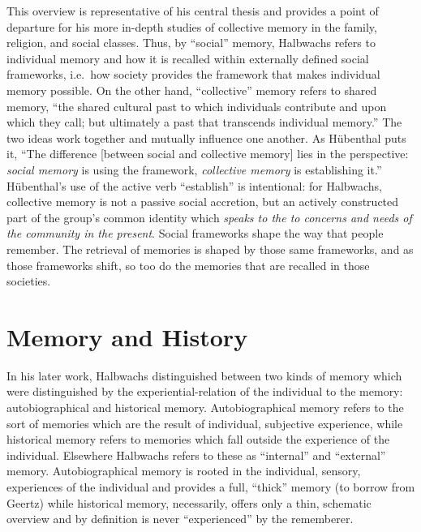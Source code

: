 This overview is representative of his central thesis and provides a
point of departure for his more in-depth studies of collective memory in
the family, religion, and social classes. Thus, by ``social'' memory,
Halbwachs refers to individual memory and how it is recalled within
externally defined social frameworks, i.e.~how society provides the
framework that makes individual memory
possible.\autocite[180]{hubenthal_carstens-hasselbalch2012} On the other
hand, ``collective'' memory refers to shared memory, ``the shared
cultural past to which individuals contribute and upon which they call;
but ultimately a past that transcends individual
memory.''\autocites[360]{keith_ec2015}[See
also][180]{hubenthal_carstens-hasselbalch2012} The two ideas work
together and mutually influence one another. As Hübenthal puts it, ``The
difference {[}between social and collective memory{]} lies in the
perspective: \emph{social memory} is using the framework,
\emph{collective memory} is establishing
it.''\autocite[180.]{hubenthal_carstens-hasselbalch2012} Hübenthal's use
of the active verb ``establish'' is intentional: for Halbwachs,
collective memory is not a passive social accretion, but an actively
constructed part of the group's common identity which \emph{speaks to
the to concerns and needs of the community in the present}. Social
frameworks shape the way that people remember. The retrieval of memories
is shaped by those same frameworks, and as those frameworks shift, so
too do the memories that are recalled in those societies.\autocites[For
a modern assessments on the malleability of human memory and the effects
of social networks on the formation of collective memory,
see][]{coman-etal_pnas2016}{yamashiro-hirst_jarmc2014}{coman-etal_yang-etal2012}

\hypertarget{memory-and-history}{%
\section{Memory and History}\label{memory-and-history}}

In his later work, Halbwachs distinguished between two kinds of memory
which were distinguished by the experiential-relation of the individual
to the memory: autobiographical and historical
memory.\autocite[52]{halbwachs1980} Autobiographical memory refers to
the sort of memories which are the result of individual, subjective
experience, while historical memory refers to memories which fall
outside the experience of the individual. Elsewhere Halbwachs refers to
these as ``internal'' and ``external'' memory. Autobiographical memory
is rooted in the individual, sensory, experiences of the individual and
provides a full, ``thick'' memory (to borrow from Geertz) while
historical memory, necessarily, offers only a thin, schematic overview
and by definition is never ``experienced'' by the rememberer.

